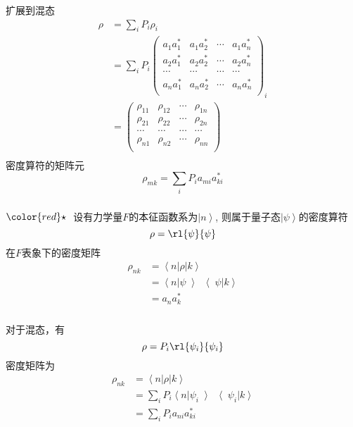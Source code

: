 \begin{frame}[label=current]
    \frametitle{}
  扩展到混态
  \[ \begin{aligned}
      \rho &= \sum_i P_i \rho _i \\
   &= \sum_i P_i \begin{pmatrix}
       a_1a_1 ^* & a_1a_2 ^* & \cdots &a_1a_n ^*  \\
       a_2a_1 ^* & a_2a_2 ^*  &\cdots & a_2a_n ^* \\
       \cdots &  \cdots &       \cdots & \cdots  \\
       a_na_1 ^* & a_na_2 ^*  &\cdots & a_na_n ^* \\
   \end{pmatrix} _i\\ 
   &= \begin{pmatrix}
       \rho_{11} & \rho_{12} & \cdots  & \rho_{1n} \\
       \rho_{21} & \rho_{22} & \cdots  & \rho_{2n} \\
       \cdots &  \cdots &       \cdots & \cdots  \\
       \rho_{n1} & \rho_{n2} & \cdots  & \rho_{nn} \\
   \end{pmatrix} \\ 
   \end{aligned}\]  
   密度算符的矩阵元 $$\rho_{mk} = \sum_iP_ia_{mi}a^*_{ki} $$
  \end{frame} 

  \begin{frame}[label=current]
    \frametitle{} 
    ${\color{red}\star}~$ 设有力学量$F$的本征函数系为$\left\vert n \right\rangle$, 则属于量子态$\left\vert \psi \right\rangle$的密度算符 
    \[ \rho = \rl{ \psi }{ \psi }\]
    在$F$表象下的密度矩阵
    \[ \begin{aligned}
        \rho _{nk} &= \left\langle n \right\vert  \rho \left\vert k \right\rangle \\ 
        &= \left\langle n \right\vert \psi \left\rangle  \right\langle \psi  \left\vert k \right\rangle \\
        &= a_n a_k^* 
    \end{aligned}\]
  \end{frame} 

  \begin{frame}[label=current]
    \frametitle{}
  对于混态，有 
  \[ \rho = P_i\rl{ \psi _i }{ \psi _i }\]
  密度矩阵为
  \[ \begin{aligned}
    \rho _{nk} &= \left\langle n \right\vert  \rho \left\vert k \right\rangle \\ 
    &= \sum_i P_i \left\langle n \right\vert \psi _i \left\rangle  \right\langle \psi _i  \left\vert k \right\rangle \\
    &= \sum_i P_i a_{ni} a_{ki}^* 
\end{aligned}\]
  \end{frame} 
 
